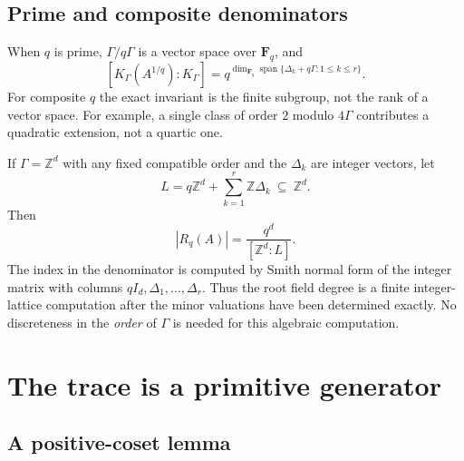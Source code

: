 \documentclass[11pt,letterpaper]{article}
\numberwithin{equation}{section}
\theoremstyle{definition}
\theoremstyle{remark}
\newcommand{\Z}{\mathbb Z}
\newcommand{\Span}{\operatorname{span}}
\begin{document}
\subsection{Prime and composite denominators}

When $q$ is prime, $\Gamma/q\Gamma$ is a vector space over $\mathbf F_q$,
and
\[
 [K_\Gamma(A^{1/q}):K_\Gamma]
 =q^{\dim_{\mathbf F_q}\Span\{\Delta_k+q\Gamma:1\le k\le r\}}.
\]
For composite $q$ the exact invariant is the finite subgroup, not the rank of
a vector space. For example, a single class of order $2$ modulo $4\Gamma$
contributes a quadratic extension, not a quartic one.

If $\Gamma=\Z^d$ with any fixed compatible order and the $\Delta_k$ are
integer vectors, let
\[
 L=q\Z^d+\sum_{k=1}^r\Z\Delta_k\ \subseteq\ \Z^d.
\]
Then
\begin{equation}\label{eq:lattice-degree}
 |R_q(A)|=\frac{q^d}{[\Z^d:L]}.
\end{equation}
The index in the denominator is computed by Smith normal form of the
integer matrix with columns $qI_d,\Delta_1,\ldots,\Delta_r$. Thus the root
field degree is a finite integer-lattice computation after the minor
valuations have been determined exactly. No discreteness in the \emph{order}
of $\Gamma$ is needed for this algebraic computation.

\section{The trace is a primitive generator}
\label{sec:trace}

\subsection{A positive-coset lemma}
\end{document}
